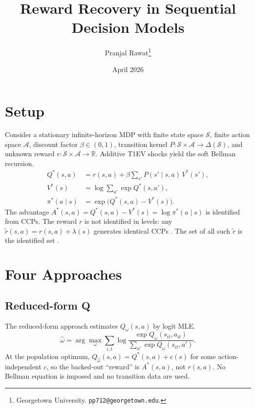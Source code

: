 \documentclass[11pt]{article}
\title{Reward Recovery in Sequential Decision Models}
\author{Pranjal Rawat\thanks{Georgetown University. \texttt{pp712@georgetown.edu}.}}
\date{April 2026}
\begin{document}
\maketitle

\section{Setup}

Consider a stationary infinite-horizon MDP with finite state space $\mathcal{S}$, finite action space $\mathcal{A}$, discount factor $\beta \in (0,1)$, transition kernel $P : \mathcal{S} \times \mathcal{A} \to \Delta(\mathcal{S})$, and unknown reward $r : \mathcal{S} \times \mathcal{A} \to \mathbb{R}$. Additive T1EV shocks yield the soft Bellman recursion.
\begin{align}
Q^*(s,a) &= r(s,a) + \beta \sum_{s'} P(s' \mid s,a)\, V^*(s'), \label{eq:bellman} \\
V^*(s) &= \log \sum_{a'} \exp Q^*(s,a'), \label{eq:value} \\
\pi^*(a \mid s) &= \exp\bigl(Q^*(s,a) - V^*(s)\bigr). \label{eq:policy}
\end{align}
The advantage $A^*(s,a) = Q^*(s,a) - V^*(s) = \log \pi^*(a \mid s)$ is identified from CCPs. The reward $r$ is not identified in levels: any $\tilde{r}(s,a) = r(s,a) + \lambda(s)$ generates identical CCPs \citep{magnac2002}. The set of all such $\tilde{r}$ is the identified set \citep{kalouptsidi2021}.

\section{Four Approaches}

\subsection{Reduced-form Q}

The reduced-form approach estimates $Q_\omega(s,a)$ by logit MLE.
\begin{equation}\label{eq:rf}
\hat\omega = \arg\max_\omega \sum_{i,t} \log \frac{\exp Q_\omega(s_{it},a_{it})}{\sum_{a'}\exp Q_\omega(s_{it},a')}.
\end{equation}
At the population optimum, $Q_{\hat\omega}(s,a) = Q^*(s,a) + c(s)$ for some action-independent $c$, so the backed-out ``reward'' is $A^*(s,a)$, not $r(s,a)$. No Bellman equation is imposed and no transition data are used.
\end{document}
